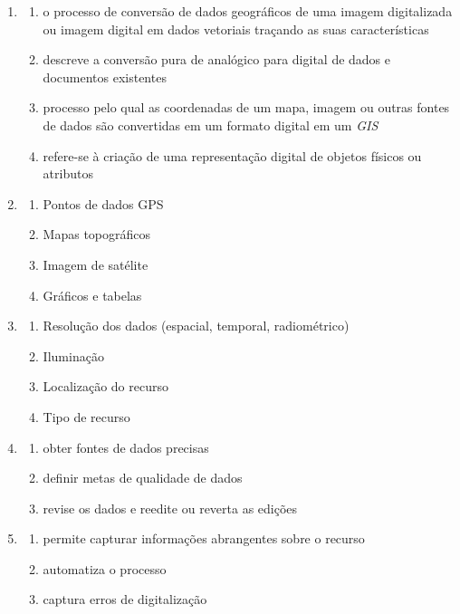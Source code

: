 \documentclass[
]{book}
\begin{document}
\begin{enumerate}
\def\labelenumi{\arabic{enumi}.}
\item
  \begin{enumerate}
  \def\labelenumii{\alph{enumii}.}
  \item
    o processo de conversão de dados geográficos de uma imagem digitalizada ou imagem digital em dados vetoriais traçando as suas características
  \item
    descreve a conversão pura de analógico para digital de dados e documentos existentes
  \item
    processo pelo qual as coordenadas de um mapa, imagem ou outras fontes de dados são convertidas em um formato digital em um \emph{GIS}
  \item
    refere-se à criação de uma representação digital de objetos físicos ou atributos
  \end{enumerate}
\item
  \begin{enumerate}
  \def\labelenumii{\alph{enumii}.}
  \item
    Pontos de dados GPS
  \item
    Mapas topográficos
  \item
    Imagem de satélite
  \item
    Gráficos e tabelas
  \end{enumerate}
\item
  \begin{enumerate}
  \def\labelenumii{\alph{enumii}.}
  \item
    Resolução dos dados (espacial, temporal, radiométrico)
  \item
    Iluminação
  \item
    Localização do recurso
  \item
    Tipo de recurso
  \end{enumerate}
\item
  \begin{enumerate}
  \def\labelenumii{\alph{enumii}.}
  \item
    obter fontes de dados precisas
  \item
    definir metas de qualidade de dados
  \item
    revise os dados e reedite ou reverta as edições
  \end{enumerate}
\item
  \begin{enumerate}
  \def\labelenumii{\alph{enumii}.}
  \item
    permite capturar informações abrangentes sobre o recurso
  \item
    automatiza o processo
  \item
    captura erros de digitalização
  \end{enumerate}
\end{enumerate}
\end{document}
